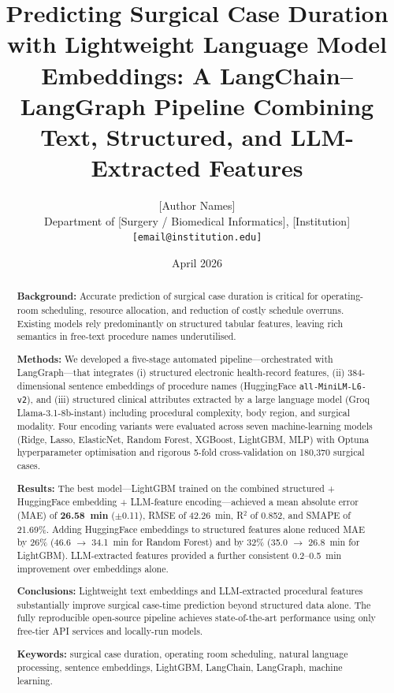 \documentclass[11pt,twocolumn]{article}
\title{\textbf{Predicting Surgical Case Duration with Lightweight Language Model Embeddings:
A LangChain--LangGraph Pipeline Combining Text, Structured, and LLM-Extracted Features}}
\author{%
  [Author Names]\\
  \small Department of [Surgery / Biomedical Informatics], [Institution]\\
  \small \texttt{[email@institution.edu]}
}
\date{April 2026}
\newcommand{\bestval}[1]{{\color{bestcol}\textbf{#1}}}
\begin{document}
\maketitle

\begin{abstract}
\textbf{Background:} Accurate prediction of surgical case duration is critical for
operating-room scheduling, resource allocation, and reduction of costly schedule
overruns. Existing models rely predominantly on structured tabular features, leaving
rich semantics in free-text procedure names underutilised.

\textbf{Methods:} We developed a five-stage automated pipeline—orchestrated with
LangGraph—that integrates (i) structured electronic health-record features,
(ii) 384-dimensional sentence embeddings of procedure names (HuggingFace
\texttt{all-MiniLM-L6-v2}), and (iii) structured clinical attributes extracted by a
large language model (Groq Llama-3.1-8b-instant) including procedural complexity,
body region, and surgical modality.  Four encoding variants were evaluated across
seven machine-learning models (Ridge, Lasso, ElasticNet, Random Forest, XGBoost,
LightGBM, MLP) with Optuna hyperparameter optimisation and rigorous 5-fold
cross-validation on 180,370 surgical cases.

\textbf{Results:} The best model—LightGBM trained on the combined
structured + HuggingFace embedding + LLM-feature encoding—achieved a mean absolute
error (MAE) of \bestval{26.58~min} ($\pm$0.11), RMSE of 42.26~min, R$^2$ of 0.852,
and SMAPE of 21.69\%.  Adding HuggingFace embeddings to structured features alone
reduced MAE by 26\% (46.6 $\to$ 34.1~min for Random Forest) and by 32\%
(35.0 $\to$ 26.8~min for LightGBM).  LLM-extracted features provided a further
consistent 0.2--0.5~min improvement over embeddings alone.

\textbf{Conclusions:} Lightweight text embeddings and LLM-extracted procedural
features substantially improve surgical case-time prediction beyond structured data
alone.  The fully reproducible open-source pipeline achieves state-of-the-art
performance using only free-tier API services and locally-run models.

\medskip
\noindent\textbf{Keywords:} surgical case duration, operating room scheduling,
natural language processing, sentence embeddings, LightGBM, LangChain, LangGraph,
machine learning.
\end{abstract}
\end{document}
